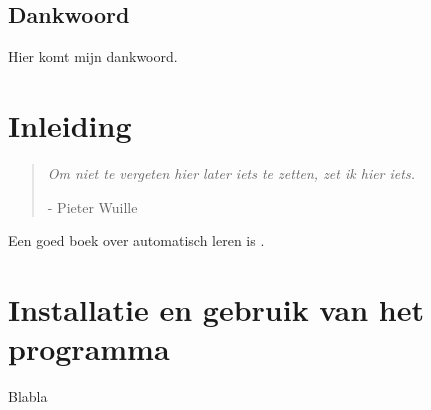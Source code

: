 \documentclass[dutch,12pt,oneside,a4paper]{book}
\newcommand{\phantomsection}{}
\begin{document}


\cleardoublepage
\section*{Dankwoord}

Hier komt mijn dankwoord.

\newpage
\tableofcontents

\newpage
\mainmatter
\chapter{Inleiding}
\label{inleiding:chap}
\begin{quote}
{{\small\it Om niet te vergeten hier later iets te zetten, zet ik hier iets.}}

{{\small\sc - Pieter Wuille}}
\end{quote}
\medskip

Een goed boek over automatisch leren is \cite{mitchell:book}.



%



\cleardoublepage{}\phantomsection{}
\appendix
\chapter{Installatie en gebruik van het programma}

Blabla

\backmatter
{}



\listoffigures
{}
\listoftables
\end{document}
